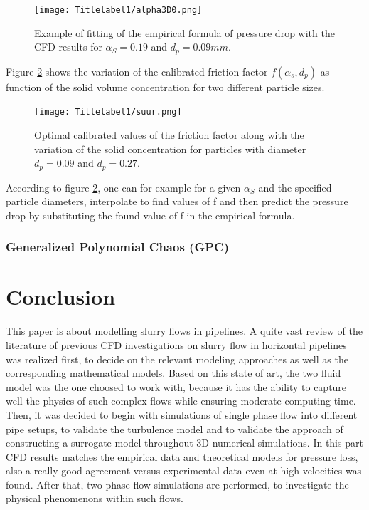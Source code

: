 \documentclass[review,3p,times,12pt]{elsarticle}
\begin{document}
\begin{figure}[H]
\begin{center}
\texttt{[image: Titlelabel1/alpha3D0.png]}
\caption{Example of fitting of the empirical formula of pressure drop with the CFD results for $\alpha_S = 0.19$ and $d_p = 0.09 mm$.}
\label{optimal}
\end{center}
\end{figure}

Figure \ref{surro} shows the variation of the calibrated friction factor $f(\alpha_s,d_p)$ as function of the solid volume concentration for two different particle sizes.
\begin{figure}[H]
\begin{center}
\texttt{[image: Titlelabel1/suur.png]}
\caption{Optimal calibrated values of the friction factor along with the variation of the solid concentration for particles with diameter $d_p=0.09$ and $d_p=0.27$.}
\label{surro}
\end{center}
\end{figure}
According to figure \ref{surro}, one can for example for a given $\alpha_S$ and the specified particle diameters, interpolate to find values of f and then predict the pressure drop by substituting the found value of f in the empirical formula.
\subsubsection{Generalized Polynomial Chaos (GPC)}




\section{Conclusion} 

This paper is about modelling slurry flows in pipelines. A quite  vast review of the literature of previous CFD investigations on slurry flow in horizontal pipelines was realized first, to decide on the relevant modeling approaches as well as the corresponding mathematical models. Based on this state of art, the two fluid model was the one choosed to work with, because it has the ability to capture well the physics of such complex flows while ensuring moderate computing time. Then, it was decided to begin with simulations of single phase flow into different pipe setups, to validate the turbulence model and to validate the approach of constructing a surrogate model throughout 3D numerical simulations. In this part CFD results matches the empirical data and theoretical models for pressure loss, also a really good agreement versus experimental data even at high velocities was found. After that, two phase flow simulations are performed, to investigate the physical phenomenons within such flows. 
\end{document}
